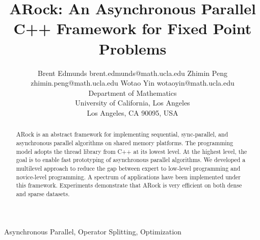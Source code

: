 \documentclass[twoside,11pt]{article}
\begin{document}
\title{ARock: An Asynchronous Parallel C++ Framework for Fixed Point Problems}

\author{\name Brent Edmunds \email  brent.edmunds@math.ucla.edu
       \AND
       \name Zhimin Peng \email zhimin.peng@math.ucla.edu
       \AND
	\name Wotao Yin \email wotaoyin@math.ucla.edu\\
       \addr Department of Mathematics\\
       University of California, Los Angeles\\
       Los Angeles, CA 90095, USA}	

\maketitle

\begin{abstract}
ARock is an abstract framework for implementing sequential, sync-parallel, and asynchronous parallel algorithms on shared memory platforms. 
The programming model adopts the thread library from C++ at its lowest level. At the highest level, the goal is to enable fast prototyping of asynchronous parallel algorithms. 
We developed a multilevel approach to reduce the gap between expert to low-level programming and novice-level programming. 
A spectrum of applications have been implemented under this framework. 
Experiments demonstrate that ARock is very efficient on both dense and sparse datasets. 
\end{abstract}

\begin{keywords}
  Asynchronous Parallel, Operator Splitting, Optimization
\end{keywords}








%

%

%


% 














\end{document}
